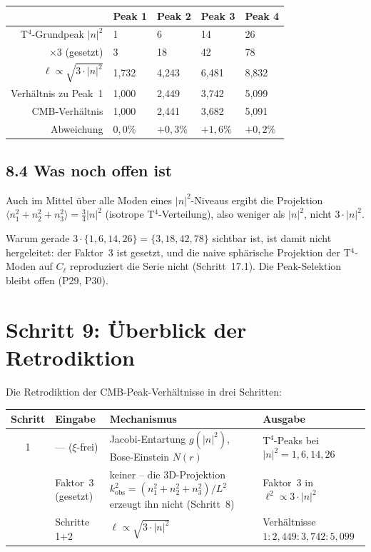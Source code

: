 \begin{center}
\begin{tabular}{rllll}
\toprule
 & Peak 1 & Peak 2 & Peak 3 & Peak 4 \\
\midrule
T$^4$-Grundpeak $|n|^2$ & 1 & 6 & 14 & 26 \\
$\times 3$ (gesetzt) & 3 & 18 & 42 & 78 \\
$\ell \propto \sqrt{3\cdot|n|^2}$ & 1{,}732 & 4{,}243 & 6{,}481 & 8{,}832 \\
Verhältnis zu Peak~1 & 1{,}000 & 2{,}449 & 3{,}742 & 5{,}099 \\
CMB-Verhältnis & 1{,}000 & 2{,}441 & 3{,}682 & 5{,}091 \\
Abweichung & $0{,}0\%$ & $+0{,}3\%$ & $+1{,}6\%$ & $+0{,}2\%$ \\
\bottomrule
\end{tabular}
\end{center}

\subsection*{8.4 Was noch offen ist}

Auch im Mittel über alle Moden eines $|n|^2$-Niveaus ergibt die
Projektion $\langle n_1^2+n_2^2+n_3^2\rangle = \tfrac{3}{4}|n|^2$
(isotrope T$^4$-Verteilung), also weniger als $|n|^2$, nicht $3\cdot|n|^2$.

Warum gerade $3\cdot\{1,6,14,26\}=\{3,18,42,78\}$ sichtbar ist, ist damit
nicht hergeleitet: der Faktor~3 ist gesetzt, und die naive sphärische
Projektion der T$^4$-Moden auf $C_\ell$ reproduziert die Serie nicht
(Schritt~17.1). Die Peak-Selektion bleibt offen (P29, P30).

\section{Schritt 9: Überblick der Retrodiktion}

Die Retrodiktion der CMB-Peak-Verhältnisse in drei Schritten:

\begin{center}
\begin{tabular}{c p{2.1cm} p{6.3cm} p{3.8cm}}
\toprule
Schritt & Eingabe & Mechanismus & Ausgabe \\
\midrule
1 & --- ($\xi$-frei) &
  Jacobi-Entartung $g(|n|^2)$, Bose-Einstein $N(r)$ &
  T$^4$-Peaks bei $|n|^2 = 1, 6, 14, 26$ \\
\addlinespace
2 & Faktor~3 (gesetzt) &
  keiner -- die 3D-Projektion
  $k_\mathrm{obs}^2 = (n_1^2+n_2^2+n_3^2)/L^2$ erzeugt ihn nicht (Schritt~8) &
  Faktor~3 in $\ell^2 \propto 3\cdot|n|^2$ \\
\addlinespace
3 & Schritte 1+2 &
  $\ell \propto \sqrt{3\cdot|n|^2}$ &
  Verhältnisse $1:2{,}449:3{,}742:5{,}099$ \\
\bottomrule
\end{tabular}
\end{center}

